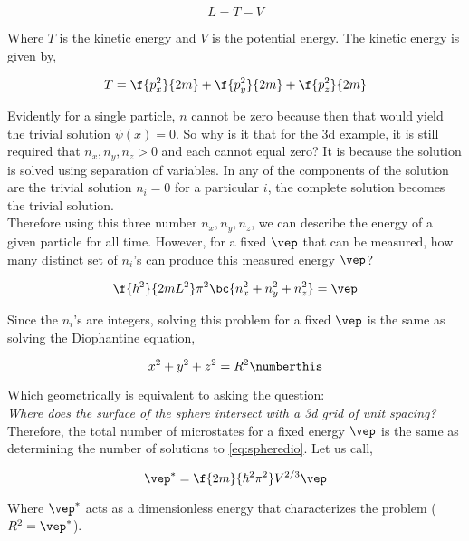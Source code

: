 \documentclass{article}
\begin{document}
\[ L = T - V \]

Where $T$ is the kinetic energy and $V$ is the potential energy. The kinetic energy is given by,

\[ T = \f{p_x^2}{2m} + \f{p_y^2}{2m} + \f{p_z^2}{2m} \]

Evidently for a single particle, $n$ cannot be zero because then that would yield the trivial solution $\psi(x) = 0$. So why is it that for the 3d example, it is still required that $n_x, n_y, n_z > 0$ and each cannot equal zero? It is because the solution is solved using separation of variables. In any of the components of the solution are the trivial solution $n_i = 0$ for a particular $i$, the complete solution becomes the trivial solution. \\

Therefore using this three number $n_x, n_y, n_z$, we can describe the energy of a given particle for all time. However, for a fixed $\vep$ that can be measured, how many distinct set of $n_i$'s can produce this measured energy $\vep$?

\[ \f{\hbar^2}{2mL^2} \pi^2 \bc{n_x^2 + n_y^2 + n_z^2} = \vep\]

Since the $n_i$'s are integers, solving this problem for a fixed $\vep$ is the same as solving the Diophantine equation,

\[ x^2 + y^2 + z^2 = R^2 \numberthis \label{eq:spheredio}\]

Which geometrically is equivalent to asking the question:\\

\textit{Where does the surface of the sphere intersect with a 3d grid of unit spacing?} \\

Therefore, the total number of microstates for a fixed energy $\vep$ is the same as determining the number of solutions to \eqref{eq:spheredio}. Let us call,

\[ \vep^* = \f{2m}{\hbar^2\pi^2}V^{2/3} \vep \]

Where $\vep^*$ acts as a dimensionless energy that characterizes the problem ($R^2 = \vep^*$).
\end{document}

